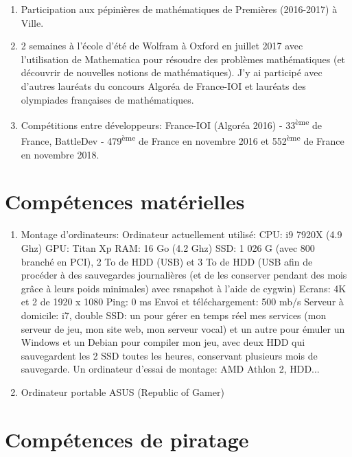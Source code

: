 \documentclass{article}
\begin{document}
		\begin{enumerate}

			\item Participation aux pépinières de mathématiques de Premières (2016-2017) à Ville.
			\item 2 semaines à l'école d'été de Wolfram à Oxford en juillet 2017 avec l'utilisation de Mathematica pour résoudre des problèmes mathématiques (et découvrir de nouvelles notions de mathématiques). J'y ai participé avec d'autres lauréats du concours Algoréa de France-IOI et lauréats des olympiades françaises de mathématiques.
			\item Compétitions entre développeurs: France-IOI (Algoréa 2016) - 33\textsuperscript{ème} de France, BattleDev - 479\textsuperscript{ème} de France en novembre 2016 et 552\textsuperscript{ème} de France en novembre 2018.

		\end{enumerate}

	\section{Compétences matérielles}

		\begin{enumerate}

			\item Montage d'ordinateurs:
				\subitem Ordinateur actuellement utilisé:
					CPU: i9 7920X (4.9 Ghz)
					GPU: Titan Xp
					RAM: 16 Go (4.2 Ghz)
					SSD: 1 026 G (avec 800 branché en PCI), 2 To de HDD (USB) et 3 To de HDD (USB afin de procéder à des sauvegardes journalières (et de les conserver pendant des mois grâce à leurs poids minimales) avec rsnapshot à l'aide de cygwin)
					Ecrans: 4K et 2 de 1920 x 1080
					Ping: 0 ms
					Envoi et téléchargement: 500 mb/s
				\subitem Serveur à domicile: i7, double SSD: un pour gérer en temps réel mes services (mon serveur de jeu, mon site web, mon serveur vocal) et un autre pour émuler un Windows et un Debian pour compiler mon jeu, avec deux HDD qui sauvegardent les 2 SSD toutes les heures, conservant plusieurs mois de sauvegarde.
				\subitem Un ordinateur d'essai de montage: AMD Athlon 2, HDD...
			\item Ordinateur portable ASUS (Republic of Gamer)

		\end{enumerate}

	\section{Compétences de piratage}
	
\end{document}
